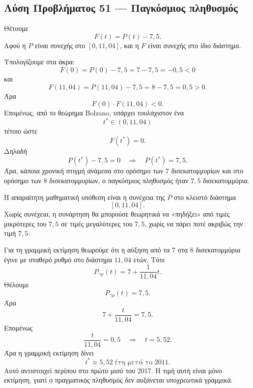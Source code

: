\subsection*{Λύση Προβλήματος 51 --- Παγκόσμιος πληθυσμός}

\begin{alist}
  \item Θέτουμε
        \[
          F(t)=P(t)-7{,}5.
        \]
        Αφού η \(P\) είναι συνεχής στο \([0,11{,}04]\), και η \(F\)
        είναι συνεχής στο ίδιο διάστημα.

        Υπολογίζουμε στα άκρα:
        \[
          F(0)=P(0)-7{,}5=7-7{,}5=-0{,}5<0
        \]
        και
        \[
          F(11{,}04)=P(11{,}04)-7{,}5=8-7{,}5=0{,}5>0.
        \]
        Άρα
        \[
          F(0)\cdot F(11{,}04)<0.
        \]
        Επομένως, από το θεώρημα Bolzano, υπάρχει τουλάχιστον ένα
        \[
          t^*\in(0,11{,}04)
        \]
        τέτοιο ώστε
        \[
          F(t^*)=0.
        \]
        Δηλαδή
        \[
          P(t^*)-7{,}5=0
          \quad\Rightarrow\quad
          {P(t^*)=7{,}5}.
        \]
        Άρα, κάποια χρονική στιγμή ανάμεσα στο ορόσημο των \(7\)
        δισεκατομμυρίων και στο ορόσημο των \(8\) δισεκατομμυρίων, ο
        παγκόσμιος πληθυσμός ήταν \(7{,}5\) δισεκατομμύρια.

  \item Η απαραίτητη μαθηματική υπόθεση είναι η συνέχεια της \(P\) στο
        κλειστό διάστημα
        \[
          [0,11{,}04].
        \]
        Χωρίς συνέχεια, η συνάρτηση θα μπορούσε θεωρητικά να «πηδήξει»
        από τιμές μικρότερες του \(7{,}5\) σε τιμές μεγαλύτερες του
        \(7{,}5\), χωρίς να πάρει ποτέ ακριβώς την τιμή \(7{,}5\).

  \item Για τη γραμμική εκτίμηση θεωρούμε ότι η αύξηση από τα \(7\) στα
        \(8\) δισεκατομμύρια έγινε με σταθερό ρυθμό στο διάστημα
        \(11{,}04\) ετών. Τότε
        \[
          P_{\text{γρ}}(t)
          =
          7+\frac{1}{11{,}04}t.
        \]
        Θέλουμε
        \[
          P_{\text{γρ}}(t)=7{,}5.
        \]
        Άρα
        \[
          7+\frac{t}{11{,}04}=7{,}5.
        \]
        Επομένως
        \[
          \frac{t}{11{,}04}=0{,}5
          \quad\Rightarrow\quad
          t=5{,}52.
        \]
        Άρα η γραμμική εκτίμηση δίνει
        \[
          {t^*\approx5{,}52\ \text{έτη μετά το 2011}}.
        \]
        Αυτό αντιστοιχεί περίπου στο πρώτο μισό του 2017. Η τιμή αυτή
        είναι μόνο εκτίμηση, γιατί ο πραγματικός πληθυσμός δεν αυξάνεται
        υποχρεωτικά γραμμικά.
\end{alist}
